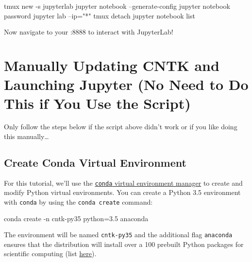 \documentclass[]{book}
\newenvironment{Shaded}{\begin{snugshade}}{\end{snugshade}}
\newcommand{\StringTok}[1]{\textcolor[rgb]{0.31,0.60,0.02}{#1}}
\newcommand{\ExtensionTok}[1]{#1}
\newcommand{\NormalTok}[1]{#1}
\theoremstyle{definition}
\theoremstyle{definition}
\theoremstyle{definition}
\theoremstyle{remark}
\begin{document}
\begin{Shaded}
\begin{Highlighting}[]

\ExtensionTok{tmux}\NormalTok{ new -s jupyterlab}
\ExtensionTok{jupyter}\NormalTok{ notebook --generate-config}
\ExtensionTok{jupyter}\NormalTok{ notebook password}
\ExtensionTok{jupyter}\NormalTok{ lab --ip=}\StringTok{"*"} 
\ExtensionTok{tmux}\NormalTok{ detach}
\ExtensionTok{jupyter}\NormalTok{ notebook list}
\end{Highlighting}
\end{Shaded}

Now navigate to your :8888 to interact with JupyterLab!

\section{\texorpdfstring{Manually Updating CNTK and Launching Jupyter
(\textbf{No Need to Do This if You Use the
Script})}{Manually Updating CNTK and Launching Jupyter (No Need to Do This if You Use the Script)}}\label{manually-updating-cntk-and-launching-jupyter-no-need-to-do-this-if-you-use-the-script}

Only follow the steps below if the script above didn't work or if you
like doing this manually\ldots{}

\subsection{Create Conda Virtual
Environment}\label{create-conda-virtual-environment}

For this tutorial, we'll use the
\href{https://conda.io/docs/using/envs.html}{\texttt{conda} virtual
environment manager} to create and modify Python virtual environments.
You can create a Python 3.5 environment with \texttt{conda} by using the
\texttt{conda\ create} command:

\begin{Shaded}
\begin{Highlighting}[]
\ExtensionTok{conda}\NormalTok{ create -n cntk-py35 python=3.5 anaconda}
\end{Highlighting}
\end{Shaded}

The environment will be named \texttt{cntk-py35} and the additional flag
\texttt{anaconda} ensures that the distribution will install over a 100
prebuilt Python packages for scientific computing (list
\href{https://docs.continuum.io/anaconda/packages/pkg-docs}{here}).
\end{document}
